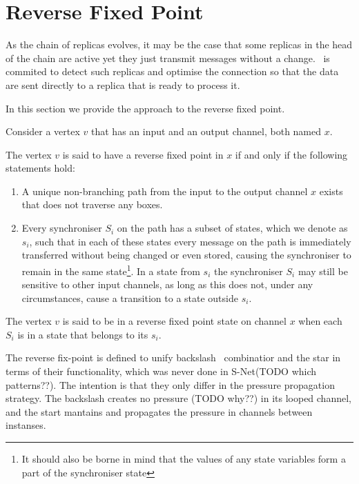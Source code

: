     \section{Reverse Fixed Point\label{rfp}}
As the chain of replicas evolves, it may be the case that some replicas in the head of the chain are active yet they just transmit messages without a change. \ak\ is commited to detect such replicas and optimise the connection so that the data are sent directly to a replica that is ready to process it. 

In this section we provide the approach to the reverse fixed point.

Consider a vertex $v$ that has an input and an output channel, both named $x$.

\begin{definition} The vertex $v$ is said to have a reverse fixed point in $x$ if and only if the following statements hold:

\begin{enumerate}
\item A unique non-branching path from the input to the output channel $x$ exists that does not traverse any boxes.

\item Every synchroniser $S_i$ on the path has a subset of states, which we denote as $s_i$, such that in each of these states every message on the path is immediately transferred without being changed or even stored, causing the synchroniser to remain in the same state\footnote{It should also be borne in mind that the values of any state variables form a part of the synchroniser state}. In a state from $s_i$ the synchroniser $S_i$ may still be sensitive to other input channels, as long as this does not, under any circumstances, cause a transition to a state outside $s_i$.
\end{enumerate}
\end{definition}

The vertex $v$ is said to be in a reverse fixed point state on channel $x$ when each $S_i$ is in a state that belongs to its $s_i$.

The reverse fix-point is defined to unify backslash \ combinatior and the star in terms of their functionality, which was never done in S-Net(TODO which patterns??). The intention is that they only differ in the pressure propagation strategy. The backslash creates no pressure (TODO why??) in its looped channel, and the start mantains and propagates the pressure in channels between instanses.

